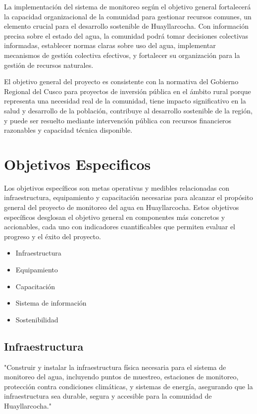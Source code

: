 La implementación del sistema de monitoreo según el objetivo general fortalecerá la capacidad organizacional de la comunidad para gestionar recursos comunes, un elemento crucial para el desarrollo sostenible de Huayllarcocha. Con información precisa sobre el estado del agua, la comunidad podrá tomar decisiones colectivas informadas, establecer normas claras sobre uso del agua, implementar mecanismos de gestión colectiva efectivos, y fortalecer su organización para la gestión de recursos naturales.

El objetivo general del proyecto es consistente con la normativa del Gobierno Regional del Cusco para proyectos de inversión pública en el ámbito rural porque representa una necesidad real de la comunidad, tiene impacto significativo en la salud y desarrollo de la población, contribuye al desarrollo sostenible de la región, y puede ser resuelto mediante intervención pública con recursos financieros razonables y capacidad técnica disponible.


\section{Objetivos Especificos}

Los objetivos específicos son metas operativas y medibles relacionadas con infraestructura, equipamiento y capacitación necesarias para alcanzar el propósito general del proyecto de monitoreo del agua en Huayllarcocha. Estos objetivos específicos desglosan el objetivo general en componentes más concretos y accionables, cada uno con indicadores cuantificables que permiten evaluar el progreso y el éxito del proyecto.


\begin{itemize}
    \item Infraestructura
    \item Equipamiento
    \item Capacitación
    \item Sistema de información
    \item Sostenibilidad
\end{itemize}

\subsection{Infraestructura}
"Construir y instalar la infraestructura física necesaria para el sistema de monitoreo del agua, incluyendo puntos de muestreo, estaciones de monitoreo, protección contra condiciones climáticas, y sistemas de energía, asegurando que la infraestructura sea durable, segura y accesible para la comunidad de Huayllarcocha."

